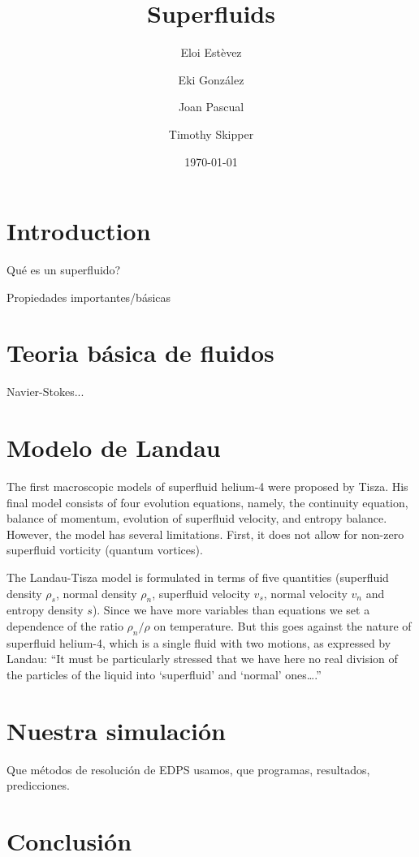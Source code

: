 \documentclass{article}
\title{Superfluids}
\author{
    Eloi Estèvez \and Eki González \and Joan Pascual \and Timothy Skipper
}
\date{\today}
\begin{document}
\maketitle
\begin{abstract}
\end{abstract}

\section{Introduction}

Qué es un superfluido?

Propiedades importantes/básicas

\section{Teoria básica de fluidos}

Navier-Stokes...

\section{Modelo de Landau}

The first macroscopic models of superfluid helium-4 were proposed by Tisza. His
final model consists of four evolution equations, namely, the continuity
equation, balance of momentum, evolution of superfluid velocity, and entropy
balance. However, the model has several limitations.  First, it does not allow
for non-zero superfluid vorticity (quantum vortices).

The Landau-Tisza model is formulated in terms of five quantities (superfluid
density $\rho_s$, normal density $\rho_n$, superfluid velocity $v_s$, normal
velocity $v_n$ and entropy density $s$). Since we have more variables than
equations we set a dependence of the ratio $\rho_n/\rho$ on temperature. But
this goes against the nature of superfluid helium-4, which is a single fluid
with two motions, as expressed by Landau: ``It must be particularly stressed
that we have here no real division of the particles of the liquid into
`superfluid' and `normal' ones\ldots.''

\section{Nuestra simulación}
Que métodos de resolución de EDPS usamos, que programas, resultados,
predicciones.

\section{Conclusión}
\end{document}
